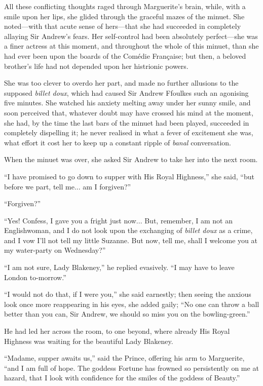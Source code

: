 \documentclass[paper=5.5in:8.5in,BCOR=7mm,twoside,DIV=calc,12pt,usegeometry,chapterprefix,endperiod,headings=big]{scrbook}
\begin{document}
All these conflicting thoughts raged through Marguerite's brain, while, with a smile upon her lips, she glided through the graceful mazes of the minuet. She noted---with that acute sense of hers---that she had succeeded in completely allaying Sir Andrew's fears. Her self-control had been absolutely perfect---she was a finer actress at this moment, and throughout the whole of this minuet, than she had ever been upon the boards of the Comédie Française; but then, a beloved brother's life had not depended upon her histrionic powers.

She was too clever to overdo her part, and made no further allusions to the supposed \textit{billet doux}, which had caused Sir Andrew Ffoulkes such an agonising five minutes. She watched his anxiety melting away under her sunny smile, and soon perceived that, whatever doubt may have crossed his mind at the moment, she had, by the time the last bars of the minuet had been played, succeeded in completely dispelling it; he never realised in what a fever of excitement she was, what effort it cost her to keep up a constant ripple of \textit{banal} conversation.

When the minuet was over, she asked Sir Andrew to take her into the next room.

\enquote{I have promised to go down to supper with His Royal Highness,} she said, \enquote{but before we part, tell me... am I forgiven?}

\enquote{Forgiven?}

\enquote{Yes! Confess, I gave you a fright just now... But, remember, I am not an Englishwoman, and I do not look upon the exchanging of \textit{billet doux} as a crime, and I vow I'll not tell my little Suzanne. But now, tell me, shall I welcome you at my water-party on Wednesday?}

\enquote{I am not sure, Lady Blakeney,} he replied evasively. \enquote{I may have to leave London to-morrow.}

\enquote{I would not do that, if I were you,} she said earnestly; then seeing the anxious look once more reappearing in his eyes, she added gaily; \enquote{No one can throw a ball better than you can, Sir Andrew, we should so miss you on the bowling-green.}

He had led her across the room, to one beyond, where already His Royal Highness was waiting for the beautiful Lady Blakeney.

\enquote{Madame, supper awaits us,} said the Prince, offering his arm to Marguerite, \enquote{and I am full of hope. The goddess Fortune has frowned so persistently on me at hazard, that I look with confidence for the smiles of the goddess of Beauty.}
\end{document}
